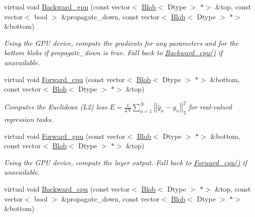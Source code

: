 \begin{DoxyCompactItemize}
virtual void \mbox{\hyperlink{classcaffe_1_1_euclidean_loss_layer_aa22a0ef4e0ab9d6a77be67c3d967b648}{Backward\+\_\+gpu}} (const vector$<$ \mbox{\hyperlink{classcaffe_1_1_blob}{Blob}}$<$ Dtype $>$ $\ast$$>$ \&top, const vector$<$ bool $>$ \&propagate\+\_\+down, const vector$<$ \mbox{\hyperlink{classcaffe_1_1_blob}{Blob}}$<$ Dtype $>$ $\ast$$>$ \&bottom)
\begin{DoxyCompactList}\small\item\em Using the G\+PU device, compute the gradients for any parameters and for the bottom blobs if propagate\+\_\+down is true. Fall back to \mbox{\hyperlink{classcaffe_1_1_euclidean_loss_layer_a577f5dad9889d01461348a4c89277089}{Backward\+\_\+cpu()}} if unavailable. \end{DoxyCompactList}\item 
virtual void \mbox{\hyperlink{classcaffe_1_1_euclidean_loss_layer_ac7395073f4f58f4af5f4127b19cc272e}{Forward\+\_\+cpu}} (const vector$<$ \mbox{\hyperlink{classcaffe_1_1_blob}{Blob}}$<$ Dtype $>$ $\ast$$>$ \&bottom, const vector$<$ \mbox{\hyperlink{classcaffe_1_1_blob}{Blob}}$<$ Dtype $>$ $\ast$$>$ \&top)
\begin{DoxyCompactList}\small\item\em Computes the Euclidean (L2) loss $ E = \frac{1}{2N} \sum\limits_{n=1}^N \left| \left| \hat{y}_n - y_n \right| \right|_2^2 $ for real-\/valued regression tasks. \end{DoxyCompactList}\item 
\mbox{\label{classcaffe_1_1_euclidean_loss_layer_a35f3694e9dd7e1920e26158e761fd8a0}} 
virtual void \mbox{\hyperlink{classcaffe_1_1_euclidean_loss_layer_a35f3694e9dd7e1920e26158e761fd8a0}{Forward\+\_\+gpu}} (const vector$<$ \mbox{\hyperlink{classcaffe_1_1_blob}{Blob}}$<$ Dtype $>$ $\ast$$>$ \&bottom, const vector$<$ \mbox{\hyperlink{classcaffe_1_1_blob}{Blob}}$<$ Dtype $>$ $\ast$$>$ \&top)
\begin{DoxyCompactList}\small\item\em Using the G\+PU device, compute the layer output. Fall back to \mbox{\hyperlink{classcaffe_1_1_euclidean_loss_layer_a3bc5a947caadac1a352a89b08720c7e7}{Forward\+\_\+cpu()}} if unavailable. \end{DoxyCompactList}\item 
virtual void \mbox{\hyperlink{classcaffe_1_1_euclidean_loss_layer_a1a67e05f127b6855055e4767b43e5ead}{Backward\+\_\+cpu}} (const vector$<$ \mbox{\hyperlink{classcaffe_1_1_blob}{Blob}}$<$ Dtype $>$ $\ast$$>$ \&top, const vector$<$ bool $>$ \&propagate\+\_\+down, const vector$<$ \mbox{\hyperlink{classcaffe_1_1_blob}{Blob}}$<$ Dtype $>$ $\ast$$>$ \&bottom)

\end{DoxyCompactItemize}

